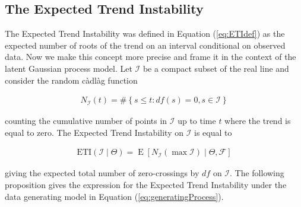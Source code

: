 \documentclass[11pt,]{article}
\DeclareMathOperator*{\E}{E}
\theoremstyle{nonumberplain}
\begin{document}
\subsection{The Expected Trend
Instability}\label{the-expected-trend-instability}

The Expected Trend Instability was defined in Equation (\ref{eq:ETIdef})
as the expected number of roots of the trend on an interval conditional
on observed data. Now we make this concept more precise and frame it in
the context of the latent Gaussian process model. Let \(\mathcal{I}\) be
a compact subset of the real line and consider the random càdlàg
function

\begin{align*}
  N_\mathcal{I}(t) = \#\left\{s \leq t : df(s) = 0, s \in \mathcal{I}\right\}
\end{align*}

counting the cumulative number of points in \(\mathcal{I}\) up to time
\(t\) where the trend is equal to zero. The Expected Trend Instability
on \(\mathcal{I}\) is equal to

\begin{align*}
  \mathrm{ETI}(\mathcal{I} \mid \Theta) = \E\left[N_{\mathcal{I}}\left(\max \mathcal{I}\right) \mid \Theta, \mathcal{F}\right]
\end{align*}

giving the expected total number of zero-crossings by \(df\) on
\(\mathcal{I}\). The following proposition gives the expression for the
Expected Trend Instability under the data generating model in Equation
(\ref{eq:generatingProcess}).

\vspace{0.2cm}
\end{document}
